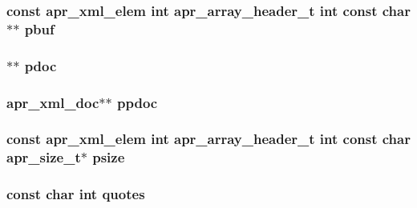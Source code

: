 \subsubsection[{\texorpdfstring{pbuf}{pbuf}}]{\setlength{\rightskip}{0pt plus 5cm}const {\bf apr\+\_\+xml\+\_\+elem} {\bf int} {\bf apr\+\_\+array\+\_\+header\+\_\+t} {\bf int} const char$\ast$$\ast$ pbuf}\hypertarget{group__APR__Util__XML_gac9cc4f26128efe6579d2643f05554964}{}\label{group__APR__Util__XML_gac9cc4f26128efe6579d2643f05554964}
\subsubsection[{\texorpdfstring{pdoc}{pdoc}}]{$\ast$$\ast$ pdoc}\hypertarget{group__APR__Util__XML_gad270a53cb15625305f196ee848a7ef4e}{}\label{group__APR__Util__XML_gad270a53cb15625305f196ee848a7ef4e}
\subsubsection[{\texorpdfstring{ppdoc}{ppdoc}}]{ {\bf apr\+\_\+xml\+\_\+doc}$\ast$$\ast$ ppdoc}\hypertarget{group__APR__Util__XML_ga66438ff2319899893737db49b7292842}{}\label{group__APR__Util__XML_ga66438ff2319899893737db49b7292842}
\subsubsection[{\texorpdfstring{psize}{psize}}]{\setlength{\rightskip}{0pt plus 5cm}const {\bf apr\+\_\+xml\+\_\+elem} {\bf int} {\bf apr\+\_\+array\+\_\+header\+\_\+t} {\bf int} const char {\bf apr\+\_\+size\+\_\+t}$\ast$ psize}\hypertarget{group__APR__Util__XML_ga0b163bd589cbbecc70b88040494de369}{}\label{group__APR__Util__XML_ga0b163bd589cbbecc70b88040494de369}
\subsubsection[{\texorpdfstring{quotes}{quotes}}]{\setlength{\rightskip}{0pt plus 5cm}const char {\bf int} quotes}\hypertarget{group__APR__Util__XML_gafd420a911b53e32b6bee4a2437a6e387}{}\label{group__APR__Util__XML_gafd420a911b53e32b6bee4a2437a6e387}
